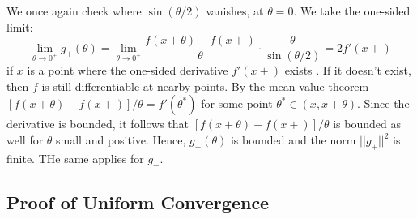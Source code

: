 We once again check where $\sin(\theta/2)$ vanishes, at $\theta = 0$. We take the one-sided limit: \begin{equation*}
    \lim\limits_{\theta\rightarrow 0^+}g_+(\theta) = \lim\limits_{\theta\rightarrow 0^+}\frac{f(x+\theta)-f(x+)}{\theta} \cdot \frac{\theta}{\sin(\theta/2)} = 2f'(x+)
\end{equation*}
if $x$ is a point where the one-sided derivative $f'(x+)$ exists . If it doesn't exist, then $f$ is still differentiable at nearby points. By the mean value theorem $[f(x+\theta)-f(x+)]/\theta = f'(\theta^*)$ for some point $\theta^* \in (x,x+\theta)$. Since the derivative is bounded, it follows that $[f(x+\theta)-f(x+)]/\theta$ is bounded as well for $\theta$ small and positive. Hence, $g_+(\theta)$ is bounded and the norm $||g_+||^2$ is finite. THe same applies for $g_-$.


\subsection{Proof of Uniform Convergence}

